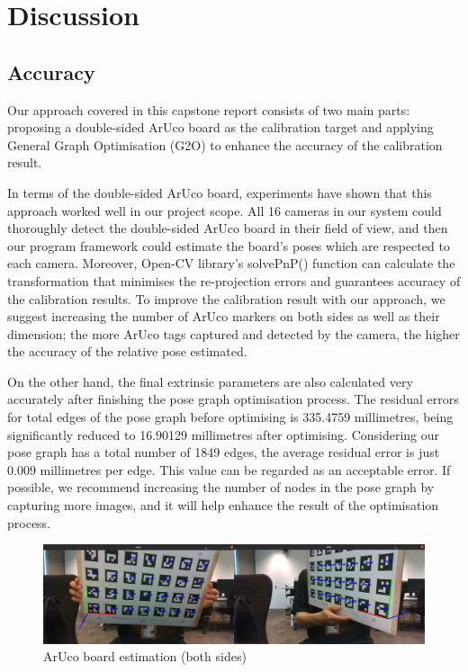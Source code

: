 \chapter{Discussion}

\section{Accuracy}

Our approach covered in this capstone report consists of two main parts: proposing a double-sided ArUco board as the calibration target and applying General Graph Optimisation (G2O) to enhance the accuracy of the calibration result.

In terms of the double-sided ArUco board, experiments have shown that this approach worked well in our project scope. All 16 cameras in our system could thoroughly detect the double-sided ArUco board in their field of view, and then our program framework could estimate the board's poses which are respected to each camera. Moreover, Open-CV library's solvePnP() function can calculate the transformation that minimises the re-projection errors and guarantees accuracy of the calibration results. To improve the calibration result with our approach, we suggest increasing the number of ArUco markers on both sides as well as their dimension; the more ArUco tags captured and detected by the camera, the higher the accuracy of the relative pose estimated.

On the other hand, the final extrinsic parameters are also calculated very accurately after finishing the pose graph optimisation process. The residual errors for total edges of the pose graph before optimising is 335.4759 millimetres, being significantly reduced to 16.90129 millimetres after optimising. Considering our pose graph has a total number of 1849 edges, the average residual error is just 0.009 millimetres per edge. This value can be regarded as an acceptable error. If possible, we recommend increasing the number of nodes in the pose graph by capturing more images, and it will help enhance the result of the optimisation process.

\begin{figure}[h]
\centering
\includegraphics[width=1\textwidth]{Images/Board detection (both sides).jpg}
\caption{ArUco board estimation (both sides)}
\end{figure}

